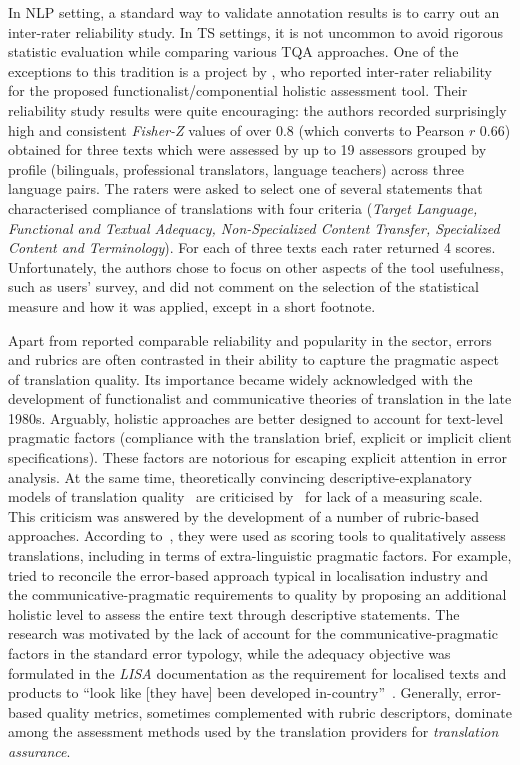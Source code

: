 \label{pg:reliability_res2}
In NLP setting, a standard way to validate annotation results is to carry out an inter-rater reliability study. In TS settings, it is not uncommon to avoid rigorous statistic evaluation while comparing various TQA approaches. One of the exceptions to this tradition is a project by \citet{Colina2008}, who reported inter-rater reliability for the proposed functionalist/componential holistic assessment tool. Their reliability study results were quite encouraging: the authors recorded surprisingly high and consistent \textit{Fisher-Z} values of over 0.8 (which converts to Pearson $r$ 0.66) obtained for three texts which were assessed by up to 19 assessors grouped by profile (bilinguals, professional translators, language teachers) across three language pairs. The raters were asked to select one of several statements that characterised compliance of translations with four criteria (\textit{Target Language, Functional and Textual Adequacy, Non-Specialized Content Transfer, Specialized Content and Terminology}). For each of three texts each rater returned 4 scores. Unfortunately, the authors chose to focus on other aspects of the tool usefulness, such as users' survey, and did not comment on the selection of the statistical measure and how it was applied, except in a short footnote. 

Apart from reported comparable reliability and popularity in the sector, errors and rubrics are often contrasted in their ability to capture the pragmatic aspect of translation quality. Its importance became widely acknowledged with the development of functionalist and communicative theories of translation in the late 1980s. Arguably, holistic approaches are better designed to account for text-level pragmatic factors (compliance with the translation brief, explicit or implicit client specifications). These factors are notorious for escaping explicit attention in error analysis. At the same time, theoretically convincing descriptive-explanatory models of translation quality~\cite{Nord2006,House2001} are criticised by~\citet{Williams2001} for lack of a measuring scale. This criticism was answered by the development of a number of rubric-based approaches. According to~\citet{Hegrenaes2020}, they were used as scoring tools to qualitatively assess translations, including in terms of extra-linguistic pragmatic factors. 
For example, \citet{JimenezCrespo2009} tried to reconcile the error-based approach typical in localisation industry and the communicative-pragmatic requirements to quality by proposing an additional holistic level to assess the entire text through descriptive statements. The research was motivated by the lack of account for the communicative-pragmatic factors in the standard error typology, while the adequacy objective was formulated in the \textit{LISA} documentation as the requirement for localised texts and products to ``look like [they have] been developed in-country''~\cite[p.11]{LISA2004}. Generally, error-based quality metrics, sometimes complemented with rubric descriptors, dominate among the assessment methods used by the translation providers for \textit{translation assurance}. 

